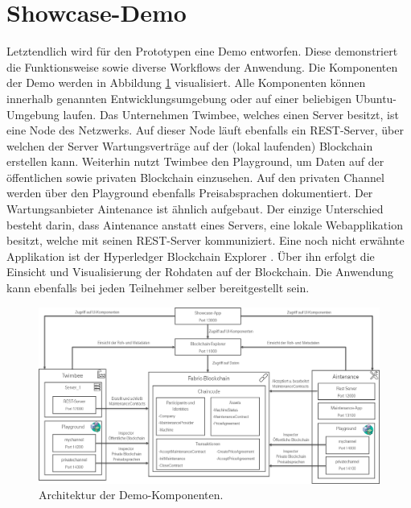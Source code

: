 \section{Showcase-Demo}
Letztendlich wird für den Prototypen eine Demo entworfen. Diese demonstriert die Funktionsweise sowie diverse Workflows der Anwendung. Die Komponenten der Demo werden in Abbildung \ref{fig:architecture-showcase} visualisiert. Alle Komponenten können innerhalb genannten Entwicklungsumgebung oder auf einer beliebigen Ubuntu-Umgebung laufen. Das Unternehmen Twimbee, welches einen Server besitzt, ist eine Node des Netzwerks. Auf dieser Node läuft ebenfalls ein REST-Server, über welchen der Server Wartungsverträge auf der (lokal laufenden) Blockchain erstellen kann. Weiterhin nutzt Twimbee den Playground, um Daten auf der öffentlichen sowie privaten Blockchain einzusehen. Auf den privaten Channel werden über den Playground ebenfalls Preisabsprachen dokumentiert. Der Wartungsanbieter Aintenance ist ähnlich aufgebaut. Der einzige Unterschied besteht darin, dass Aintenance anstatt eines Servers, eine lokale Webapplikation besitzt, welche mit seinen REST-Server kommuniziert. Eine noch nicht erwähnte Applikation ist der Hyperledger Blockchain Explorer \cite{HyperledgerBlockchainExplorerTeamHyperledgerBlockchainExplorer2018}. Über ihn erfolgt die Einsicht und Visualisierung der Rohdaten auf der Blockchain. Die Anwendung kann ebenfalls bei jeden Teilnehmer selber bereitgestellt sein.

\begin{figure}[!htbp]
    \centering
      \includegraphics[width=1.0\textwidth,angle=0]{images/architecture_showcase}
       \caption{Architektur der Demo-Komponenten.}
      \label{fig:architecture-showcase}
\end{figure}

